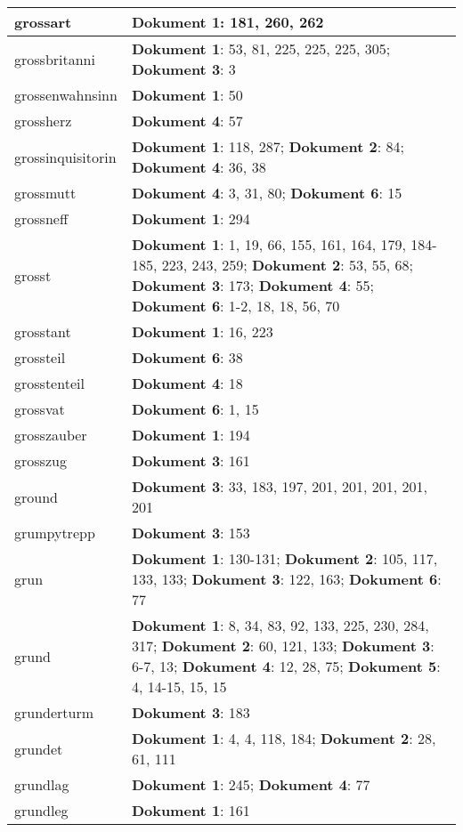 \documentclass[a5paper]{article}
\begin{document}
\begin{longtable}[l]{|l|p{3in}|}
\hline
grossart & \textbf{Dokument 1}: 181, 260, 262 \\
\hline
grossbritanni & \textbf{Dokument 1}: 53, 81, 225, 225, 225, 305; \textbf{Dokument 3}: 3 \\
\hline
grossenwahnsinn & \textbf{Dokument 1}: 50 \\
\hline
grossherz & \textbf{Dokument 4}: 57 \\
\hline
grossinquisitorin & \textbf{Dokument 1}: 118, 287; \textbf{Dokument 2}: 84; \textbf{Dokument 4}: 36, 38 \\
\hline
grossmutt & \textbf{Dokument 4}: 3, 31, 80; \textbf{Dokument 6}: 15 \\
\hline
grossneff & \textbf{Dokument 1}: 294 \\
\hline
grosst & \textbf{Dokument 1}: 1, 19, 66, 155, 161, 164, 179, 184-185, 223, 243, 259; \textbf{Dokument 2}: 53, 55, 68; \textbf{Dokument 3}: 173; \textbf{Dokument 4}: 55; \textbf{Dokument 6}: 1-2, 18, 18, 56, 70 \\
\hline
grosstant & \textbf{Dokument 1}: 16, 223 \\
\hline
grossteil & \textbf{Dokument 6}: 38 \\
\hline
grosstenteil & \textbf{Dokument 4}: 18 \\
\hline
grossvat & \textbf{Dokument 6}: 1, 15 \\
\hline
grosszauber & \textbf{Dokument 1}: 194 \\
\hline
grosszug & \textbf{Dokument 3}: 161 \\
\hline
ground & \textbf{Dokument 3}: 33, 183, 197, 201, 201, 201, 201, 201 \\
\hline
grumpytrepp & \textbf{Dokument 3}: 153 \\
\hline
grun & \textbf{Dokument 1}: 130-131; \textbf{Dokument 2}: 105, 117, 133, 133; \textbf{Dokument 3}: 122, 163; \textbf{Dokument 6}: 77 \\
\hline
grund & \textbf{Dokument 1}: 8, 34, 83, 92, 133, 225, 230, 284, 317; \textbf{Dokument 2}: 60, 121, 133; \textbf{Dokument 3}: 6-7, 13; \textbf{Dokument 4}: 12, 28, 75; \textbf{Dokument 5}: 4, 14-15, 15, 15 \\
\hline
grunderturm & \textbf{Dokument 3}: 183 \\
\hline
grundet & \textbf{Dokument 1}: 4, 4, 118, 184; \textbf{Dokument 2}: 28, 61, 111 \\
\hline
grundlag & \textbf{Dokument 1}: 245; \textbf{Dokument 4}: 77 \\
\hline
grundleg & \textbf{Dokument 1}: 161 \\

\end{longtable}
\end{document}
